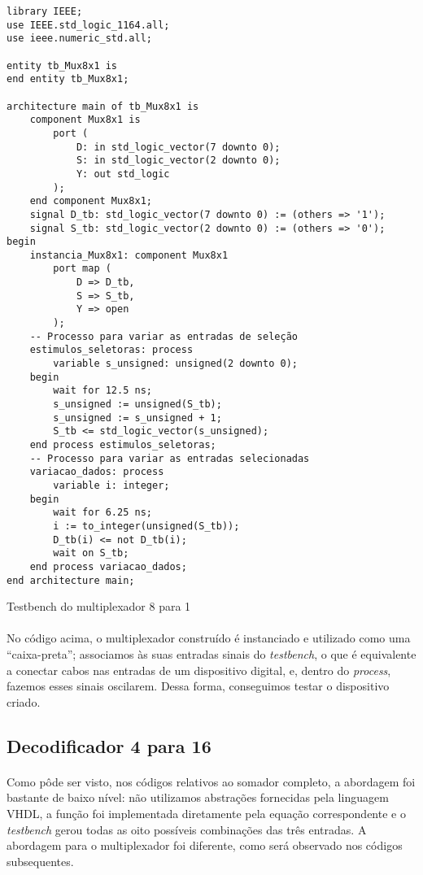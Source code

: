 \documentclass[a4paper,12pt]{article}
\newenvironment{code}{\captionsetup{type=listing}}{}
\begin{document}
\begin{code}
\begin{verbatim}
library IEEE;
use IEEE.std_logic_1164.all;
use ieee.numeric_std.all;

entity tb_Mux8x1 is
end entity tb_Mux8x1;

architecture main of tb_Mux8x1 is
    component Mux8x1 is
        port (
            D: in std_logic_vector(7 downto 0);
            S: in std_logic_vector(2 downto 0);
            Y: out std_logic
        );
    end component Mux8x1;
    signal D_tb: std_logic_vector(7 downto 0) := (others => '1');
    signal S_tb: std_logic_vector(2 downto 0) := (others => '0');
begin
    instancia_Mux8x1: component Mux8x1
        port map (
            D => D_tb,
            S => S_tb,
            Y => open
        );
    -- Processo para variar as entradas de seleção
    estimulos_seletoras: process
        variable s_unsigned: unsigned(2 downto 0);
    begin
        wait for 12.5 ns;
        s_unsigned := unsigned(S_tb);
        s_unsigned := s_unsigned + 1;
        S_tb <= std_logic_vector(s_unsigned);
    end process estimulos_seletoras;
    -- Processo para variar as entradas selecionadas
    variacao_dados: process
        variable i: integer;
    begin
        wait for 6.25 ns;
        i := to_integer(unsigned(S_tb));
        D_tb(i) <= not D_tb(i);
        wait on S_tb;
    end process variacao_dados;
end architecture main;
\end{verbatim}
\caption{Testbench do multiplexador 8 para 1}
\end{code}

\paragraph{}
No código acima, o multiplexador construído é instanciado e utilizado como uma ``caixa-preta''; associamos às suas entradas sinais do \textit{testbench}, o que é equivalente a conectar cabos nas entradas de um dispositivo digital, e, dentro do \textit{process}, fazemos esses sinais oscilarem. Dessa forma, conseguimos testar o dispositivo criado.

\subsection{Decodificador 4 para 16}
\paragraph{}
Como pôde ser visto, nos códigos relativos ao somador completo, a abordagem foi bastante de baixo nível: não utilizamos abstrações fornecidas pela linguagem VHDL, a função foi implementada diretamente pela equação correspondente e o \textit{testbench} gerou todas as oito possíveis combinações das três entradas. A abordagem para o multiplexador foi diferente, como será observado nos códigos subsequentes.
\end{document}
